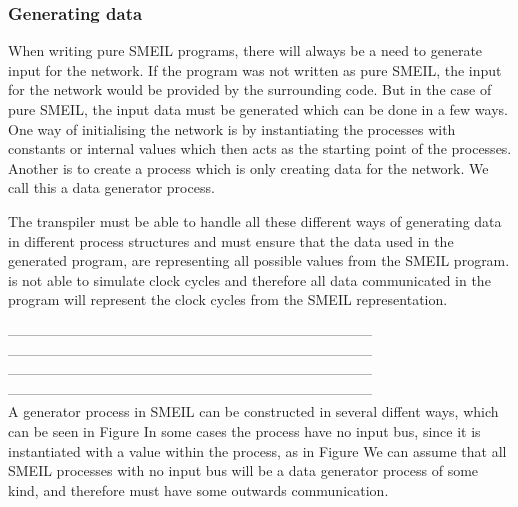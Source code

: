 \subsubsection{Generating data}
When writing pure SMEIL programs, there will always be a need to generate input for the network. If the program was not written as pure SMEIL, the input for the network would be provided by the surrounding code. But in the case of pure SMEIL, the input data must be generated which can be done in a few ways.
One way of initialising the network is by instantiating the processes with constants or internal values which then acts as the starting point of the processes. Another is to create a process which is only creating data for the network. We call this a data generator process.

The transpiler must be able to handle all these different ways of generating data in different process structures and must ensure that the data used in the generated program, are representing all possible values from the SMEIL program.
\cspm is not able to simulate clock cycles and therefore all data communicated in the \cspm program will represent the clock cycles from the SMEIL representation.



------------------------------------------------------------------------------\\
------------------------------------------------------------------------------\\
------------------------------------------------------------------------------\\
------------------------------------------------------------------------------\\


A generator process in SMEIL can be constructed in several diffent ways, which can be seen in Figure %
In some cases the process have no input bus, since it is instantiated with a value within the process, as in Figure %
We can assume that all SMEIL processes with no input bus will be a data generator process of some kind, and therefore must have some outwards communication. %

